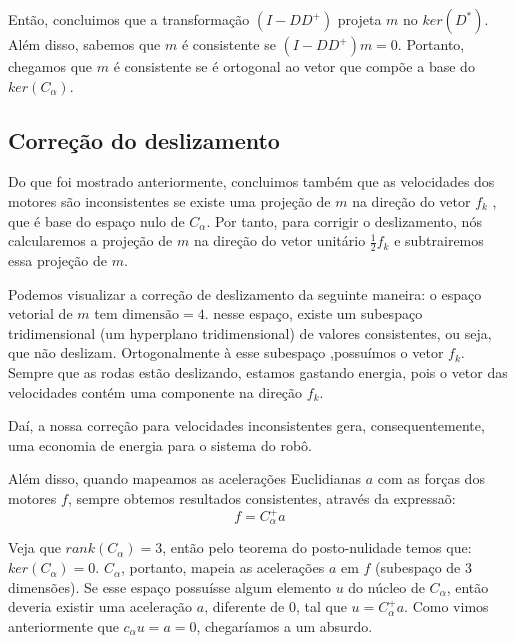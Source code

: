 \documentclass{article}
\begin{document}
Então, concluimos que a transformação $(I-DD^+)$ projeta $m$ no $ker(D^*)$. Além disso, sabemos que $m$ é consistente se $(I-DD^+)m = 0$. Portanto, chegamos que $m$ é consistente se é ortogonal ao vetor que compõe a base do $ker(C_{\alpha})$.

\subsection{Correção do deslizamento}

\hspace{1cm} Do que foi mostrado anteriormente, concluimos também que as velocidades dos motores são inconsistentes se existe uma projeção de $m$ na direção do vetor $f_k$ , que é base do espaço nulo de $C_{\alpha}$. Por tanto, para corrigir o deslizamento, nós calcularemos a projeção de $m$ na direção do vetor unitário $\frac{1}{2}f_k$ e subtrairemos essa projeção de $m$.

Podemos visualizar a correção de deslizamento da seguinte maneira: o espaço vetorial de $m$ tem $\text{dimensão}= 4$. nesse espaço, existe um subespaço tridimensional (um hyperplano tridimensional) de valores consistentes, ou seja, que não deslizam. Ortogonalmente à esse subespaço ,possuímos o vetor $f_{k}$. Sempre que as rodas estão deslizando, estamos gastando energia, pois o vetor das velocidades contém uma componente na direção $f_{k}$.

Daí, a nossa correção para velocidades inconsistentes gera, consequentemente, uma economia de energia para o sistema do robô.

Além disso, quando mapeamos as acelerações Euclidianas $a$ com as forças dos motores $f$, sempre obtemos resultados consistentes, através da expressaõ:
\[f = C_{\alpha}^+a\]

Veja que $rank(C_{\alpha}) = 3$, então pelo teorema do posto-nulidade temos que: $ker(C_{\alpha}) = 0$. $C_{\alpha}$, portanto, mapeia as acelerações $a$  em $f$ (subespaço de 3 dimensões). Se esse espaço possuísse algum elemento $u$ do núcleo de $C_{\alpha}$, então deveria existir uma aceleração $a$, diferente de 0, tal que $u = C_{\alpha}^+a$. Como vimos anteriormente que $c_ {\alpha}u = a = 0$, chegaríamos a um absurdo.
\end{document}
